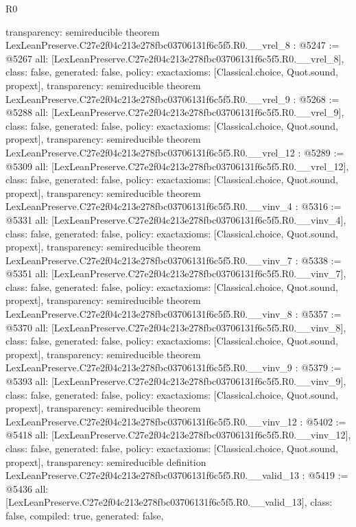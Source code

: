 \begin{lexlean}{R0}
\begin{coremodule}
{  transparency: semireducible
}
theorem LexLeanPreserve.C27e2f04c213e278fbc03706131f6c5f5.R0.__vrel_8 : @5247 := @5267 {
  all: [LexLeanPreserve.C27e2f04c213e278fbc03706131f6c5f5.R0.__vrel_8],
  class: false,
  generated: false,
  policy: exact{axioms: [Classical.choice, Quot.sound, propext]},
  transparency: semireducible
}
theorem LexLeanPreserve.C27e2f04c213e278fbc03706131f6c5f5.R0.__vrel_9 : @5268 := @5288 {
  all: [LexLeanPreserve.C27e2f04c213e278fbc03706131f6c5f5.R0.__vrel_9],
  class: false,
  generated: false,
  policy: exact{axioms: [Classical.choice, Quot.sound, propext]},
  transparency: semireducible
}
theorem LexLeanPreserve.C27e2f04c213e278fbc03706131f6c5f5.R0.__vrel_12 : @5289 := @5309 {
  all: [LexLeanPreserve.C27e2f04c213e278fbc03706131f6c5f5.R0.__vrel_12],
  class: false,
  generated: false,
  policy: exact{axioms: [Classical.choice, Quot.sound, propext]},
  transparency: semireducible
}
theorem LexLeanPreserve.C27e2f04c213e278fbc03706131f6c5f5.R0.__vinv_4 : @5316 := @5331 {
  all: [LexLeanPreserve.C27e2f04c213e278fbc03706131f6c5f5.R0.__vinv_4],
  class: false,
  generated: false,
  policy: exact{axioms: [Classical.choice, Quot.sound, propext]},
  transparency: semireducible
}
theorem LexLeanPreserve.C27e2f04c213e278fbc03706131f6c5f5.R0.__vinv_7 : @5338 := @5351 {
  all: [LexLeanPreserve.C27e2f04c213e278fbc03706131f6c5f5.R0.__vinv_7],
  class: false,
  generated: false,
  policy: exact{axioms: [Classical.choice, Quot.sound, propext]},
  transparency: semireducible
}
theorem LexLeanPreserve.C27e2f04c213e278fbc03706131f6c5f5.R0.__vinv_8 : @5357 := @5370 {
  all: [LexLeanPreserve.C27e2f04c213e278fbc03706131f6c5f5.R0.__vinv_8],
  class: false,
  generated: false,
  policy: exact{axioms: [Classical.choice, Quot.sound, propext]},
  transparency: semireducible
}
theorem LexLeanPreserve.C27e2f04c213e278fbc03706131f6c5f5.R0.__vinv_9 : @5379 := @5393 {
  all: [LexLeanPreserve.C27e2f04c213e278fbc03706131f6c5f5.R0.__vinv_9],
  class: false,
  generated: false,
  policy: exact{axioms: [Classical.choice, Quot.sound, propext]},
  transparency: semireducible
}
theorem LexLeanPreserve.C27e2f04c213e278fbc03706131f6c5f5.R0.__vinv_12 : @5402 := @5418 {
  all: [LexLeanPreserve.C27e2f04c213e278fbc03706131f6c5f5.R0.__vinv_12],
  class: false,
  generated: false,
  policy: exact{axioms: [Classical.choice, Quot.sound, propext]},
  transparency: semireducible
}
definition LexLeanPreserve.C27e2f04c213e278fbc03706131f6c5f5.R0.__valid_13 : @5419 := @5436 {
  all: [LexLeanPreserve.C27e2f04c213e278fbc03706131f6c5f5.R0.__valid_13],
  class: false,
  compiled: true,
  generated: false,
}
\end{coremodule}
\end{lexlean}
